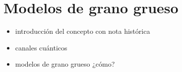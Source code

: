 \section{Modelos de grano grueso}\label{sec:Ch1CG}


\begin{itemize}
\item introducción del concepto con nota histórica
\item canales cuánticos
\item modelos de grano grueso ¿cómo?
\end{itemize}

